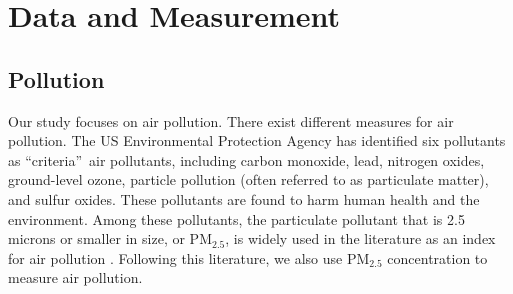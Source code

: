 \documentclass[12pt]{article}
\begin{document}
    \section{Data and Measurement}

    \label{sec:3}
    
    \subsection{Pollution}
    
    \label{sec:3.1} Our study focuses on air pollution. There exist different
    measures for air pollution. The US Environmental Protection Agency has
    identified six pollutants as \textquotedblleft criteria\textquotedblright\
    air pollutants, including carbon monoxide, lead, nitrogen oxides,
    ground-level ozone, particle pollution (often referred to as particulate
    matter), and sulfur oxides. These pollutants are found to harm human health
    and the environment. Among these pollutants, the particulate pollutant that
    is 2.5 microns or smaller in size, or $\mathrm{PM_{2.5}}$, is widely used in
    the literature as an index for air pollution %
    \citep{chang2016particulate,fu2021air,NBERw28401}. Following this literature, we also
    use $\mathrm{PM_{2.5}}$ concentration to measure air pollution.
    
\end{document}
